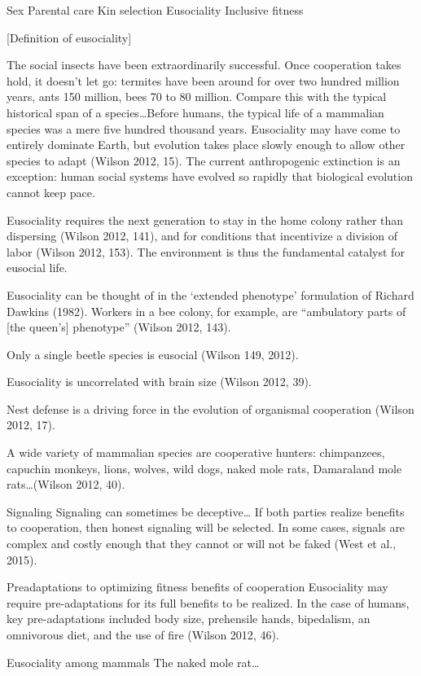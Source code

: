 \documentclass{tufte-book} %
\begin{document}
Sex
Parental care
Kin selection
Eusociality
Inclusive fitness

[Definition of eusociality]

The social insects have been extraordinarily successful. Once cooperation takes hold, it doesn’t let go: termites have been around for over two hundred million years, ants 150 million, bees 70 to 80 million. Compare this with the typical historical span of a species…Before humans, the typical life of a mammalian species was a mere five hundred thousand years. Eusociality may have come to entirely dominate Earth, but evolution takes place slowly enough to allow other species to adapt (Wilson 2012, 15). The current anthropogenic extinction is an exception: human social systems have evolved so rapidly that biological evolution cannot keep pace. 

Eusociality requires the next generation to stay in the home colony rather than dispersing (Wilson 2012, 141), and for conditions that incentivize a division of labor (Wilson 2012, 153). The environment is thus the fundamental catalyst for eusocial life.

Eusociality can be thought of in the ‘extended phenotype’ formulation of Richard Dawkins (1982). Workers in a bee colony, for example, are “ambulatory parts of [the queen’s] phenotype” (Wilson 2012, 143).

Only a single beetle species is eusocial (Wilson 149, 2012). 

Eusociality is uncorrelated with brain size (Wilson 2012, 39).

Nest defense is a driving force in the evolution of organismal cooperation (Wilson 2012, 17).

A wide variety of mammalian species are cooperative hunters: chimpanzees, capuchin monkeys, lions, wolves, wild dogs, naked mole rats, Damaraland mole rats…(Wilson 2012, 40).

Signaling
Signaling can sometimes be deceptive…
If both parties realize benefits to cooperation, then honest signaling will be selected. In some cases, signals are complex and costly enough that they cannot or will not be faked (West et al., 2015). 

Preadaptations to optimizing fitness benefits of cooperation
Eusociality may require pre-adaptations for its full benefits to be realized. In the case of humans, key pre-adaptations included body size, prehensile hands, bipedalism, an omnivorous diet, and the use of fire (Wilson 2012, 46).

Eusociality among mammals
The naked mole rat…
\end{document}
